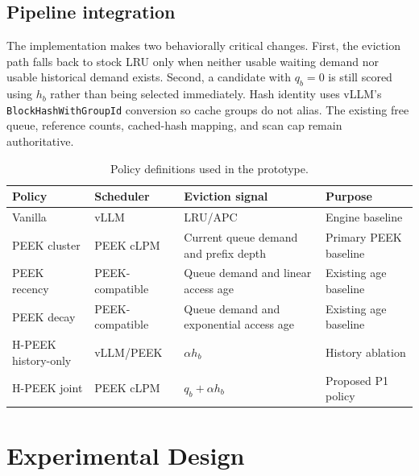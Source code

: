 \documentclass[10pt,twocolumn]{article}
\begin{document}
\subsection{Pipeline integration}

The implementation makes two behaviorally critical changes. First, the
eviction path falls back to stock LRU only when neither usable waiting demand
nor usable historical demand exists. Second, a candidate with $q_b=0$ is still
scored using $h_b$ rather than being selected immediately. Hash identity uses
vLLM's \texttt{BlockHashWithGroupId} conversion so cache groups do not alias.
The existing free queue, reference counts, cached-hash mapping, and scan cap
remain authoritative.

\begin{table}[t]
  \centering
  \caption{Policy definitions used in the prototype.}
  \label{tab:policies}
  \begin{tabularx}{\textwidth}{lllX}
    \toprule
    Policy & Scheduler & Eviction signal & Purpose \\
    \midrule
    Vanilla & vLLM & LRU/APC & Engine baseline \\
    PEEK cluster & PEEK cLPM & Current queue demand and prefix depth & Primary PEEK baseline \\
    PEEK recency & PEEK-compatible & Queue demand and linear access age & Existing age baseline \\
    PEEK decay & PEEK-compatible & Queue demand and exponential access age & Existing age baseline \\
    H-PEEK history-only & vLLM/PEEK & $\alpha h_b$ & History ablation \\
    H-PEEK joint & PEEK cLPM & $q_b+\alpha h_b$ & Proposed P1 policy \\
    \bottomrule
  \end{tabularx}
\end{table}

\section{Experimental Design}
\end{document}
